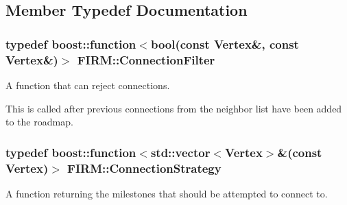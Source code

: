 \subsection{\-Member \-Typedef \-Documentation}
\hypertarget{class_f_i_r_m_a2482eee2e5248d5bff3b3b56e5a593b3}{
\subsubsection[{\-Connection\-Filter}]{\setlength{\rightskip}{0pt plus 5cm}typedef boost\-::function$<$bool(const \-Vertex\&, const \-Vertex\&)$>$ {\bf \-F\-I\-R\-M\-::\-Connection\-Filter}}}\label{class_f_i_r_m_a2482eee2e5248d5bff3b3b56e5a593b3}


\-A function that can reject connections. 

\-This is called after previous connections from the neighbor list have been added to the roadmap. \hypertarget{class_f_i_r_m_a15cfbcaf52c0bdd5e6c1a969bbf7ea1e}{
\subsubsection[{\-Connection\-Strategy}]{\setlength{\rightskip}{0pt plus 5cm}typedef boost\-::function$<$std\-::vector$<$\-Vertex$>$\&(const \-Vertex)$>$ {\bf \-F\-I\-R\-M\-::\-Connection\-Strategy}}}\label{class_f_i_r_m_a15cfbcaf52c0bdd5e6c1a969bbf7ea1e}


\-A function returning the milestones that should be attempted to connect to. 

